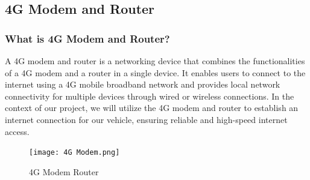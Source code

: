 \documentclass[
12pt,
oneside, 
onehalfspacing, 
nolistspacing, 
parskip, 
chapterinoneline, 
]{AASTCOMPUTER}
\begin{document}
\subsection{4G Modem and Router}
\subsubsection{What is 4G Modem and Router?}
A 4G modem and router is a networking device that combines the functionalities of a 4G modem and a router in a single device. It enables users to connect to the internet using a 4G mobile broadband network and provides local network connectivity for multiple devices through wired or wireless connections. In the context of our project, we will utilize the 4G modem and router to establish an internet connection for our vehicle, ensuring reliable and high-speed internet access.
\begin{figure}[!ht]
\centering
\texttt{[image: 4G Modem.png]}
\caption[4G Modem Router]{4G Modem Router}
\label{fig:TCU}
\end{figure}
\end{document}
